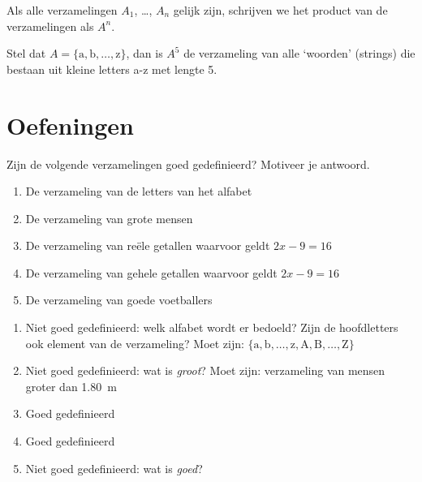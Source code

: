 Als alle verzamelingen $A_1$, \dots, $A_n$ gelijk zijn, schrijven we het product van de verzamelingen als $A^n$.

Stel dat $A=\{\mathrm{a}, \mathrm{b},\dots,\mathrm{z}\}$, dan is $A^5$ de verzameling van alle `woorden' (strings) die bestaan uit kleine letters a-z met lengte 5. 
 
 
 
\newpage 
\section{Oefeningen}
\begin{oef}
Zijn de volgende verzamelingen goed gedefinieerd? Motiveer je antwoord.
\begin{enumerate}
\item De verzameling van de letters van het alfabet
\item De verzameling van grote mensen
\item De verzameling van re\"ele getallen waarvoor geldt $2x-9=16$
\item De verzameling van gehele getallen waarvoor geldt $2x-9=16$
\item De verzameling van goede voetballers
\end{enumerate}
\begin{opl}
\begin{enumerate}
\item Niet goed gedefinieerd: welk alfabet wordt er bedoeld? Zijn de hoofdletters ook element van de verzameling? Moet zijn: $\{\text{a},\text{b},\dots,\text{z},\text{A},\text{B},\dots,\text{Z}\}$
\item Niet goed gedefinieerd: wat is \emph{groot}? Moet zijn: verzameling van mensen groter dan \SI{1.80}{\meter}
\item Goed gedefinieerd
\item Goed gedefinieerd
\item Niet goed gedefinieerd: wat is \emph{goed}?
\end{enumerate}
\end{opl}
\end{oef}



